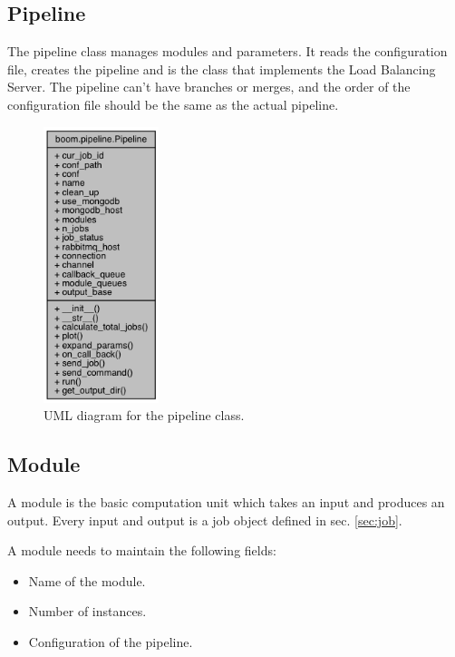\documentclass{article}
\begin{document}
    \subsection{Pipeline}
    The pipeline class manages modules and parameters.
    It reads the configuration file, creates the pipeline and is the class that implements the Load Balancing Server.
    The pipeline can't have branches or merges, and the order of the configuration file should be the same as the actual pipeline.

    \begin{figure}[h]
        \begin{center}
            \includegraphics[width=0.3\textwidth]{fig/pipeline_uml.png}
        \end{center}
        \caption{UML diagram for the pipeline class.}\label{fig:pipeline_uml}
    \end{figure}

    \subsection{Module}
    A module is the basic computation unit which takes an input and produces an output.
    Every input and output is a job object defined in sec. \ref{sec:job}.

    A module needs to maintain the following fields:
    \begin{itemize}
        \item Name of the module.
        \item Number of instances.
        \item Configuration of the pipeline.
    \end{itemize}
\end{document}

